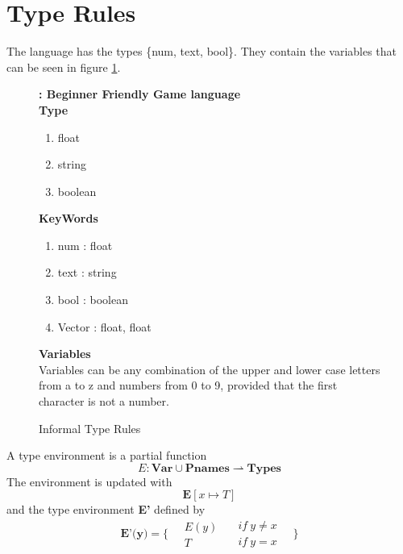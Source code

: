 \section{Type Rules}\label{sec:TypeRules}
The language \lang{} has the types \{num, text, bool\}. They contain the variables that can be seen in figure \ref{fig:InTypeRules}.

\begin{figure}[H]
\noindent\makebox[\linewidth]{\rule{\textwidth}{0.4pt}}
    \textbf{\lang{}: Beginner Friendly Game language} \\
    \textbf{Type}
    \begin{enumerate}  
        \item float 
        \item string
        \item boolean
    \end{enumerate}
    \textbf{KeyWords}
    \begin{enumerate}  
        \item num : float 
        \item text : string 
        \item bool : boolean 
        \item Vector : float, float
    \end{enumerate}
    \textbf{Variables}\\
    Variables can be any combination of the upper and lower case letters from a to z and numbers from 0 to 9, provided that the first character is not a number.\\
    \noindent\makebox[\linewidth]{\rule{\textwidth}{0.4pt}}
    \caption{Informal Type Rules}
    \label{fig:InTypeRules}
\end{figure}

A type environment is a partial function \[E : \textbf{Var} \cup \textbf{Pnames} \rightharpoonup \textbf{Types}\]
The environment is updated with 
\[ \textbf{E}[x\mapsto T] \] 
and the type environment \textbf{E'} defined by
\[\textbf{E'(y)} = \bigg \{ \quad \begin{aligned}  E(y) \\ T \end{aligned} \quad \begin{aligned} if\ y \neq x \\ if\ y = x \end{aligned}\quad \bigg \} \]

